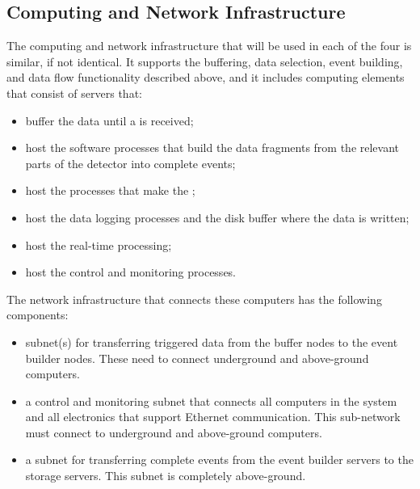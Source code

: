 
\subsection{Computing and Network Infrastructure}
\label{sec:fd-daq-infra}


The computing and network infrastructure that will be used in each
of the four  is similar, if not identical.
It supports the buffering, data selection, event
building, and data flow functionality described
above, and it includes computing elements that consist of servers that:

\begin{itemize}
\item buffer the data until a 
  is received;
\item host the software processes that
  build the data fragments from the relevant
  parts of the detector into complete events;
\item host the processes that make the
  ;
\item host the data logging processes and
  the disk buffer where the data is written;
\item host the real-time  processing;
\item host the control and monitoring processes.
\end{itemize}

The network infrastructure that connects these computers has the following components:

\begin{itemize}
\item subnet(s) for transferring triggered data from the buffer
  nodes to the event builder nodes.  These need to
  connect underground and above-ground computers.
\item a control and monitoring subnet that connects all
  computers in the  system and all 
  electronics that support Ethernet communication.  This
  sub-network must connect to underground and
  above-ground computers.
\item a subnet for transferring complete events from the
  event builder servers to the storage servers.  This subnet
  is completely above-ground.
\end{itemize}
